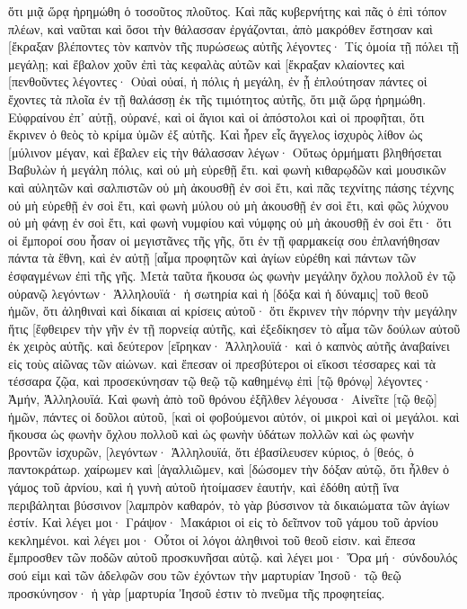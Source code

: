 ὅτι μιᾷ ὥρᾳ ἠρημώθη ὁ τοσοῦτος πλοῦτος. Καὶ πᾶς κυβερνήτης καὶ πᾶς ὁ ἐπὶ τόπον πλέων, καὶ ναῦται καὶ ὅσοι τὴν θάλασσαν ἐργάζονται, ἀπὸ μακρόθεν ἔστησαν 
καὶ [ἔκραξαν βλέποντες τὸν καπνὸν τῆς πυρώσεως αὐτῆς λέγοντες· Τίς ὁμοία τῇ πόλει τῇ μεγάλῃ; 
καὶ ἔβαλον χοῦν ἐπὶ τὰς κεφαλὰς αὐτῶν καὶ [ἔκραξαν κλαίοντες καὶ [πενθοῦντες λέγοντες· Οὐαὶ οὐαί, ἡ πόλις ἡ μεγάλη, ἐν ᾗ ἐπλούτησαν πάντες οἱ ἔχοντες τὰ πλοῖα ἐν τῇ θαλάσσῃ ἐκ τῆς τιμιότητος αὐτῆς, ὅτι μιᾷ ὥρᾳ ἠρημώθη. 
Εὐφραίνου ἐπ᾽ αὐτῇ, οὐρανέ, καὶ οἱ ἅγιοι καὶ οἱ ἀπόστολοι καὶ οἱ προφῆται, ὅτι ἔκρινεν ὁ θεὸς τὸ κρίμα ὑμῶν ἐξ αὐτῆς. 
Καὶ ἦρεν εἷς ἄγγελος ἰσχυρὸς λίθον ὡς [μύλινον μέγαν, καὶ ἔβαλεν εἰς τὴν θάλασσαν λέγων· Οὕτως ὁρμήματι βληθήσεται Βαβυλὼν ἡ μεγάλη πόλις, καὶ οὐ μὴ εὑρεθῇ ἔτι. 
καὶ φωνὴ κιθαρῳδῶν καὶ μουσικῶν καὶ αὐλητῶν καὶ σαλπιστῶν οὐ μὴ ἀκουσθῇ ἐν σοὶ ἔτι, καὶ πᾶς τεχνίτης πάσης τέχνης οὐ μὴ εὑρεθῇ ἐν σοὶ ἔτι, καὶ φωνὴ μύλου οὐ μὴ ἀκουσθῇ ἐν σοὶ ἔτι, 
καὶ φῶς λύχνου οὐ μὴ φάνῃ ἐν σοὶ ἔτι, καὶ φωνὴ νυμφίου καὶ νύμφης οὐ μὴ ἀκουσθῇ ἐν σοὶ ἔτι· ὅτι οἱ ἔμποροί σου ἦσαν οἱ μεγιστᾶνες τῆς γῆς, ὅτι ἐν τῇ φαρμακείᾳ σου ἐπλανήθησαν πάντα τὰ ἔθνη, 
καὶ ἐν αὐτῇ [αἷμα προφητῶν καὶ ἁγίων εὑρέθη καὶ πάντων τῶν ἐσφαγμένων ἐπὶ τῆς γῆς. 
Μετὰ ταῦτα ἤκουσα ὡς φωνὴν μεγάλην ὄχλου πολλοῦ ἐν τῷ οὐρανῷ λεγόντων· Ἁλληλουϊά· ἡ σωτηρία καὶ ἡ [δόξα καὶ ἡ δύναμις] τοῦ θεοῦ ἡμῶν, 
ὅτι ἀληθιναὶ καὶ δίκαιαι αἱ κρίσεις αὐτοῦ· ὅτι ἔκρινεν τὴν πόρνην τὴν μεγάλην ἥτις [ἔφθειρεν τὴν γῆν ἐν τῇ πορνείᾳ αὐτῆς, καὶ ἐξεδίκησεν τὸ αἷμα τῶν δούλων αὐτοῦ ἐκ χειρὸς αὐτῆς. 
καὶ δεύτερον [εἴρηκαν· Ἁλληλουϊά· καὶ ὁ καπνὸς αὐτῆς ἀναβαίνει εἰς τοὺς αἰῶνας τῶν αἰώνων. 
καὶ ἔπεσαν οἱ πρεσβύτεροι οἱ εἴκοσι τέσσαρες καὶ τὰ τέσσαρα ζῷα, καὶ προσεκύνησαν τῷ θεῷ τῷ καθημένῳ ἐπὶ [τῷ θρόνῳ] λέγοντες· Ἀμήν, Ἁλληλουϊά. 
Καὶ φωνὴ ἀπὸ τοῦ θρόνου ἐξῆλθεν λέγουσα· Αἰνεῖτε [τῷ θεῷ] ἡμῶν, πάντες οἱ δοῦλοι αὐτοῦ, [καὶ οἱ φοβούμενοι αὐτόν, οἱ μικροὶ καὶ οἱ μεγάλοι. 
καὶ ἤκουσα ὡς φωνὴν ὄχλου πολλοῦ καὶ ὡς φωνὴν ὑδάτων πολλῶν καὶ ὡς φωνὴν βροντῶν ἰσχυρῶν, [λεγόντων· Ἁλληλουϊά, ὅτι ἐβασίλευσεν κύριος, ὁ [θεός, ὁ παντοκράτωρ. 
χαίρωμεν καὶ [ἀγαλλιῶμεν, καὶ [δώσομεν τὴν δόξαν αὐτῷ, ὅτι ἦλθεν ὁ γάμος τοῦ ἀρνίου, καὶ ἡ γυνὴ αὐτοῦ ἡτοίμασεν ἑαυτήν, 
καὶ ἐδόθη αὐτῇ ἵνα περιβάληται βύσσινον [λαμπρὸν καθαρόν, τὸ γὰρ βύσσινον τὰ δικαιώματα τῶν ἁγίων ἐστίν. 
Καὶ λέγει μοι· Γράψον· Μακάριοι οἱ εἰς τὸ δεῖπνον τοῦ γάμου τοῦ ἀρνίου κεκλημένοι. καὶ λέγει μοι· Οὗτοι οἱ λόγοι ἀληθινοὶ τοῦ θεοῦ εἰσιν. 
καὶ ἔπεσα ἔμπροσθεν τῶν ποδῶν αὐτοῦ προσκυνῆσαι αὐτῷ. καὶ λέγει μοι· Ὅρα μή· σύνδουλός σού εἰμι καὶ τῶν ἀδελφῶν σου τῶν ἐχόντων τὴν μαρτυρίαν Ἰησοῦ· τῷ θεῷ προσκύνησον· ἡ γὰρ [μαρτυρία Ἰησοῦ ἐστιν τὸ πνεῦμα τῆς προφητείας. 
